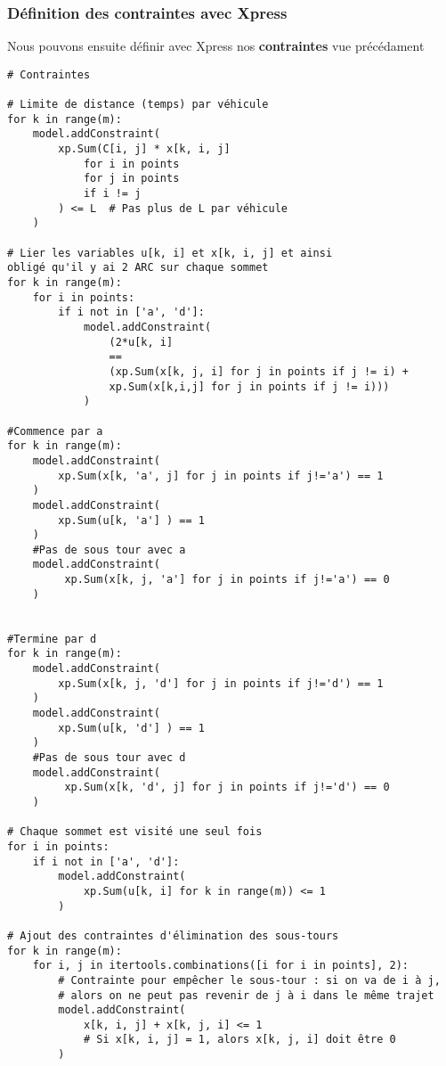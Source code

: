 \documentclass[a4paper, 12pt, DIV=12]{scrartcl}
\begin{document}
\subsubsection{Définition des contraintes avec Xpress}
Nous pouvons ensuite définir avec Xpress nos \textbf{contraintes} vue précédament
\begin{center}
\begin{verbatim}
# Contraintes

# Limite de distance (temps) par véhicule
for k in range(m):
    model.addConstraint(
        xp.Sum(C[i, j] * x[k, i, j] 
            for i in points 
            for j in points 
            if i != j
        ) <= L  # Pas plus de L par véhicule
    )

# Lier les variables u[k, i] et x[k, i, j] et ainsi 
obligé qu'il y ai 2 ARC sur chaque sommet
for k in range(m):
    for i in points:
        if i not in ['a', 'd']:
            model.addConstraint(
                (2*u[k, i] 
                == 
                (xp.Sum(x[k, j, i] for j in points if j != i) + 
                xp.Sum(x[k,i,j] for j in points if j != i)))
            )
    
#Commence par a
for k in range(m):
    model.addConstraint(
        xp.Sum(x[k, 'a', j] for j in points if j!='a') == 1
    )
    model.addConstraint(
        xp.Sum(u[k, 'a'] ) == 1
    )
    #Pas de sous tour avec a
    model.addConstraint(
         xp.Sum(x[k, j, 'a'] for j in points if j!='a') == 0
    )


#Termine par d
for k in range(m):
    model.addConstraint(
        xp.Sum(x[k, j, 'd'] for j in points if j!='d') == 1
    )
    model.addConstraint(
        xp.Sum(u[k, 'd'] ) == 1
    )
    #Pas de sous tour avec d
    model.addConstraint(
         xp.Sum(x[k, 'd', j] for j in points if j!='d') == 0
    )

# Chaque sommet est visité une seul fois
for i in points:
    if i not in ['a', 'd']:
        model.addConstraint(
            xp.Sum(u[k, i] for k in range(m)) <= 1
        )

# Ajout des contraintes d'élimination des sous-tours
for k in range(m):
    for i, j in itertools.combinations([i for i in points], 2):
        # Contrainte pour empêcher le sous-tour : si on va de i à j, 
        # alors on ne peut pas revenir de j à i dans le même trajet
        model.addConstraint(
            x[k, i, j] + x[k, j, i] <= 1  
            # Si x[k, i, j] = 1, alors x[k, j, i] doit être 0
        )

\end{verbatim}
\end{center}
\newpage
\end{document}
